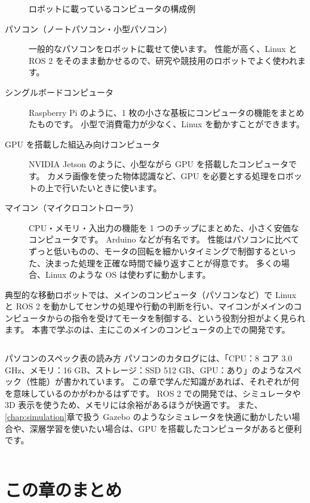 \begin{figure}[tb]
  \centering
  
  \caption{ロボットに載っているコンピュータの構成例}
  \label{fig:computer-robot}
\end{figure}

\begin{description}
  \item[パソコン（ノートパソコン・小型パソコン）]
    一般的なパソコンをロボットに載せて使います。
    性能が高く、Linux と ROS 2 をそのまま動かせるので、研究や競技用のロボットでよく使われます。
  \item[シングルボードコンピュータ]
    Raspberry Pi のように、1 枚の小さな基板にコンピュータの機能をまとめたものです。
    小型で消費電力が少なく、Linux を動かすことができます。
  \item[GPU を搭載した組込み向けコンピュータ]
    NVIDIA Jetson のように、小型ながら GPU を搭載したコンピュータです。
    カメラ画像を使った物体認識など、GPU を必要とする処理をロボットの上で行いたいときに使います。
  \item[マイコン（マイクロコントローラ）]
    CPU・メモリ・入出力の機能を 1 つのチップにまとめた、小さく安価なコンピュータです。
    Arduino などが有名です。
    性能はパソコンに比べてずっと低いものの、モータの回転を細かいタイミングで制御するといった、決まった処理を正確な時間で繰り返すことが得意です。
    多くの場合、Linux のような OS は使わずに動かします。
\end{description}

典型的な移動ロボットでは、メインのコンピュータ（パソコンなど）で Linux と ROS 2 を動かしてセンサの処理や行動の判断を行い、マイコンがメインのコンピュータからの指令を受けてモータを制御する、という役割分担がよく見られます。
本書で学ぶのは、主にこのメインのコンピュータの上での開発です。

\begin{column}{パソコンのスペック表の読み方}
  パソコンのカタログには、「CPU：8 コア 3.0 GHz、メモリ：16 GB、ストレージ：SSD 512 GB、GPU：あり」のようなスペック（性能）が書かれています。
  この章で学んだ知識があれば、それぞれが何を意味しているのかがわかるはずです。
  ROS 2 での開発では、シミュレータや 3D 表示を使うため、メモリには余裕があるほうが快適です。
  また、\ref{chap:simulation}章で扱う Gazebo のようなシミュレータを快適に動かしたい場合や、深層学習を使いたい場合は、GPU を搭載したコンピュータがあると便利です。
\end{column}

\section*{この章のまとめ}

